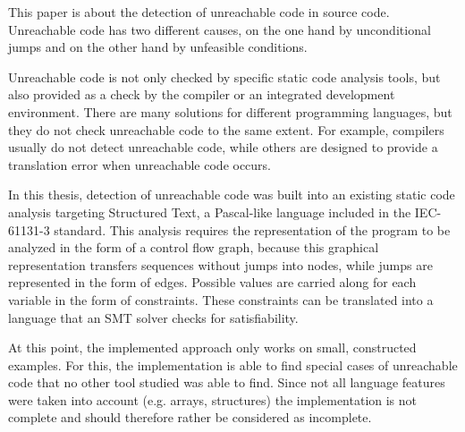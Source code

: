 This paper is about the detection of unreachable code in source code. 
Unreachable code has two different causes, on the one hand by unconditional jumps and on the other hand by unfeasible conditions.

Unreachable code is not only checked by specific static code analysis tools, but also provided as a check by the compiler or an integrated development environment. There are many solutions for different programming languages, but they do not check unreachable code to the same extent. For example, compilers usually do not detect unreachable code, while others are designed to provide a translation error when unreachable code occurs.


In this thesis, detection of unreachable code was built into an existing static code analysis targeting Structured Text, a Pascal-like language included in the IEC-61131-3 standard. This analysis requires the representation of the program to be analyzed in the form of a control flow graph, because this graphical representation transfers sequences without jumps into nodes, while jumps are represented in the form of edges. Possible values are carried along for each variable in the form of constraints. These constraints can be translated into a language that an SMT solver checks for satisfiability. 

At this point, the implemented approach only works on small, constructed examples. For this, the implementation is able to find special cases of unreachable code that no other tool studied was able to find. Since not all language features were taken into account (e.g. arrays, structures) the implementation is not complete and should therefore rather be considered as incomplete.

